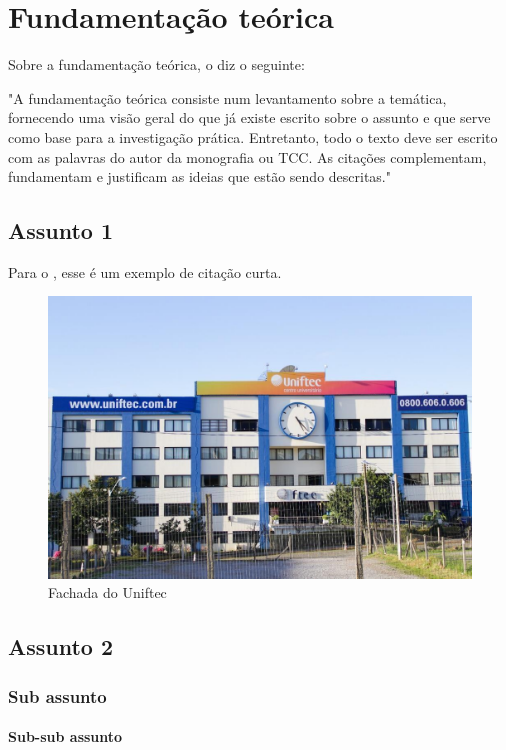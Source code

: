 \chapter{Fundamentação teórica}

Sobre a fundamentação teórica, o  diz o seguinte:

\begin{citacao}
"A fundamentação teórica consiste num levantamento sobre a temática, fornecendo uma visão geral do que já existe escrito sobre o assunto e que serve como base para a investigação prática. Entretanto, todo o texto deve ser escrito com as palavras do autor da monografia ou TCC. As citações complementam, fundamentam e justificam as ideias que estão sendo descritas."
\end{citacao}

\section{Assunto 1}

Para o , esse é um exemplo de citação curta.

\lipsum[1-2]

\begin{figure}[!ht]
    \centering
    \caption{Fachada do Uniftec}
    \label{graf1}
    \includegraphics[width=1\textwidth]{img/fachada.jpg}
    \captionsetup{justification=normal}
\end{figure}

\section{Assunto 2}

\lipsum[2-3]

\subsection{Sub assunto}

\lipsum[3-4]

\subsubsection{Sub-sub assunto}

\lipsum[4-5]


\lipsum[5-6]